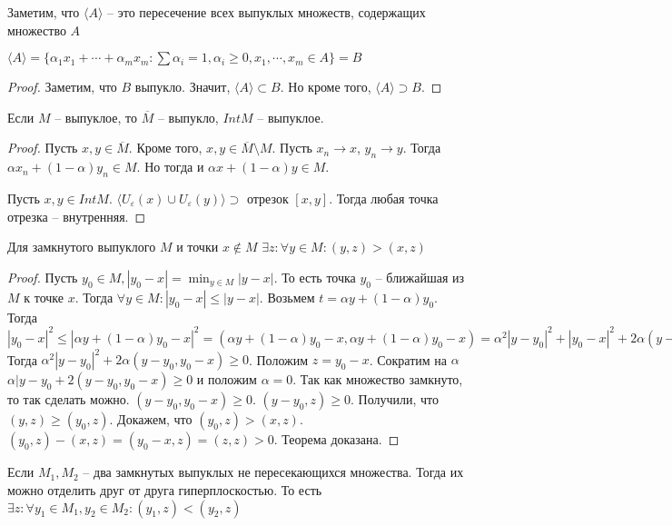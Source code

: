 \documentclass[document.tex]{subfiles}
\begin{document}
\begin{remark}
    Заметим, что $\langle A \rangle$ -- это пересечение всех выпуклых множеств, содержащих множество $A$
\end{remark}

\begin{statement}
    $\langle A \rangle = \{\alpha_1 x_1 + \cdots + \alpha_m x_m : \sum \alpha_i = 1, \alpha_i \geq 0, x_1, \cdots, x_m
    \in A\} = B$
\end{statement}

\begin{proof}
    Заметим, что $B$ выпукло. Значит, $\langle A \rangle \subset B$. Но кроме того, $\langle A \rangle \supset B$.
\end{proof}

\begin{statement}
    Если $M$ -- выпуклое, то $\overline M$ -- выпукло, $Int M$ -- выпуклое.
\end{statement}

\begin{proof}
    Пусть $x, y \in \overline M$. Кроме того, $x, y \in \overline M \setminus M$. Пусть $x_n \rightarrow x$, $y_n
    \rightarrow y$. Тогда $\alpha x_n + (1 - \alpha) y_n \in M$. Но тогда и $\alpha x + (1 - \alpha)y \in M$.

    Пусть $x, y \in Int M$. $\langle U_{\varepsilon}(x) \cup U_{\varepsilon}(y) \rangle \supset$ отрезок $[x, y]$.
    Тогда любая точка отрезка -- внутренняя.
\end{proof}

\begin{theorem}
    Для замкнутого выпуклого $M$ и точки $x \not \in M$ $\exists z : \forall y \in M : (y, z) > (x, z)$
\end{theorem}

\begin{proof}
    Пусть $y_0 \in M, |y_0 - x| = \min_{y \in M} |y - x|$. То есть точка $y_0$ -- ближайшая из $M$ к точке $x$. Тогда
    $\forall y \in M : |y_0 - x| \leq |y - x|$. Возьмем $t  = \alpha y + (1 - \alpha) y_0$. Тогда $|y_0 - x|^2 \leq
    |\alpha y + (1 - \alpha)y_0 - x|^2 = (\alpha y + (1 - \alpha) y_0 - x, \alpha y + (1 - \alpha) y_0 - x) = \alpha^2
    |y - y_0|^2 + |y_0 - x|^2 + 2 \alpha (y - y_0, y_0 - x)$
    Тогда $\alpha^2 |y - y_0|^2 + 2 \alpha (y - y_0, y_0 - x) \geq 0$. Положим $z = y_0 - x$. Сократим на $\alpha$
    $\alpha |y - y_0 + 2 (y - y_0, y_0 - x) \geq 0$ и положим $\alpha = 0$. Так как множество замкнуто, то так сделать
    можно. $(y - y_0, y_0 - x) \geq 0$. $(y - y_0, z) \geq 0$. Получили, что $(y, z) \geq (y_0, z)$. Докажем, что $(y_0,
    z) > (x, z)$. $(y_0, z) - (x, z) = (y_0 - x, z) = (z, z) > 0$. Теорема доказана.
\end{proof}
\begin{theorem}
    Если $M_1, M_2$ -- два замкнутых выпуклых не пересекающихся множества. Тогда их можно отделить друг от друга
    гиперплоскостью. То есть $\exists z: \forall y_1 \in M_1, y_2 \in M_2: (y_1, z) < (y_2, z)$
\end{theorem}
\end{document}

